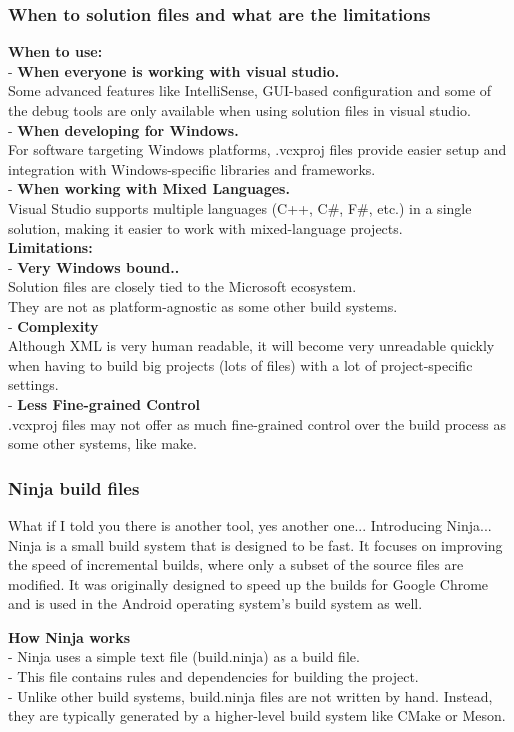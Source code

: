 \documentclass{beamer}
\begin{document}
\begin{frame}
    \frametitle{When to solution files and what are the limitations}
    \footnotesize
    \textbf{When to use:}\\
    - \textbf{When everyone is working with visual studio.} \\
    Some advanced features like IntelliSense, GUI-based configuration and some of the debug tools are only available when using solution files in visual studio. \\
    - \textbf{When developing for Windows.} \\
    For software targeting Windows platforms, .vcxproj files provide easier setup and integration with Windows-specific libraries and frameworks.\\
    - \textbf{When working with Mixed Languages.} \\
    Visual Studio supports multiple languages (C++, C\#, F\#, etc.) in a single solution, making it easier to work with mixed-language projects.\\
    \textbf{Limitations:}\\
    - \textbf{Very Windows bound..}\\
    Solution files are closely tied to the Microsoft ecosystem. \\ They are not as platform-agnostic as some other build systems.\\
    - \textbf{Complexity} \\
    Although XML is very human readable, it will become very unreadable quickly when having to build big projects (lots of files) with a lot of project-specific settings. \\
    - \textbf{Less Fine-grained Control} \\
    .vcxproj files may not offer as much fine-grained control over the build process as some other systems, like make.
\end{frame}

\begin{frame}
\frametitle{Ninja build files}
What if I told you there is another tool, yes another one... Introducing Ninja...\\
Ninja is a small build system that is designed to be fast. It focuses on improving the speed of incremental builds, where only a subset of the source files are modified. It was originally designed to speed up the builds for Google Chrome and is used in the Android operating system's build system as well.\\ \bigskip

\textbf{How Ninja works}  \\
- Ninja uses a simple text file (build.ninja) as a build file. \\
- This file contains rules and dependencies for building the project. \\
- Unlike other build systems, build.ninja files are not written by hand. Instead, they are typically generated by a higher-level build system like CMake or Meson. \\
\end{frame}
\end{document}

